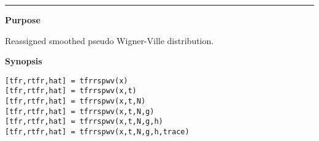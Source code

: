 

\hspace*{-1.6cm}{\Large \bf tfrrspwv}

\vspace*{-.4cm}
\hspace*{-1.6cm}\rule[0in]{16.5cm}{.02cm}
\vspace*{.2cm}

{\bf \large {}\selectfont Purpose}\\
\hspace*{1.5cm}
\begin{minipage}[t]{13.5cm}
Reassigned smoothed pseudo Wigner-Ville distribution.
\end{minipage}
\vspace*{.5cm}

{\bf \large {}\selectfont Synopsis}\\
\hspace*{1.5cm}
\begin{minipage}[t]{13.5cm}
\begin{verbatim}
[tfr,rtfr,hat] = tfrrspwv(x) 
[tfr,rtfr,hat] = tfrrspwv(x,t) 
[tfr,rtfr,hat] = tfrrspwv(x,t,N) 
[tfr,rtfr,hat] = tfrrspwv(x,t,N,g) 
[tfr,rtfr,hat] = tfrrspwv(x,t,N,g,h) 
[tfr,rtfr,hat] = tfrrspwv(x,t,N,g,h,trace) 
\end{verbatim}
\end{minipage}
\vspace*{.5cm}

